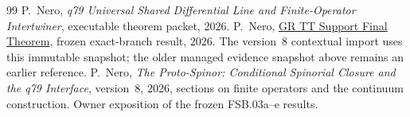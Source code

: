 \documentclass[11pt]{article}
\begin{document}
\begin{thebibliography}{99}
P.~Nero, \emph{q79 Universal Shared Differential Line and Finite-Operator
Intertwiner}, executable theorem packet, 2026.
P.~Nero, \href{https://github.com/PeterNero/mtt-results-repro/blob/f141a20ea23c5c3ff19cc2161c0e226e29ade8a7/release/results/gr_tt_support/artifact.json}{GR TT Support Final Theorem}, frozen exact-branch result, 2026.
The version~8 contextual import uses this immutable snapshot; the older
managed evidence snapshot above remains an earlier reference.
P.~Nero, \emph{The Proto-Spinor: Conditional Spinorial Closure and the q79
Interface}, version~8, 2026, sections on finite operators and the continuum
construction. Owner exposition of the frozen FSB.03a--e results.
\end{thebibliography}
\end{document}
